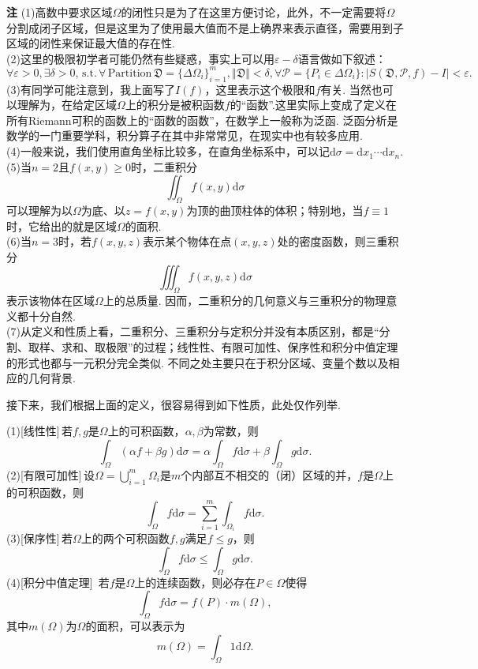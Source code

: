 \documentclass{ctexart}
\newenvironment{custom}[1]{\par\noindent \textbf{#1}\quad}{\par\vspace{1em}}
\begin{document}
\begin{custom}{注}
(1)高数中要求区域$\Omega$的闭性只是为了在这里方便讨论，此外，不一定需要将$\Omega$分割成闭子区域，但是这里为了使用最大值而不是上确界来表示直径，需要用到子区域的闭性来保证最大值的存在性.\\
(2)这里的极限初学者可能仍然有些疑惑，事实上可以用$\varepsilon-\delta$语言做如下叙述：
$$\forall \varepsilon>0,\exists \delta>0,\,\mathrm{s.t.}\,\forall\,\mathrm{Partition}\,\mathfrak{D}=\{\Delta\Omega_{i}\}_{i=1}^{m},\Vert\mathfrak{D}\Vert<\delta,\forall \mathcal{P}=\{P_{i}\in\Delta\Omega_{i}\}:|S(\mathfrak{D},\mathcal{P},f)-I|<\varepsilon.$$
(3)有同学可能注意到，我上面写了$I(f)$，这里表示这个极限和$f$有关. 当然也可以理解为，在给定区域$\Omega$上的积分是被积函数$f$的“函数”.这里实际上变成了定义在所有Riemann可积的函数上的“函数的函数”，在数学上一般称为泛函. 泛函分析是数学的一门重要学科，积分算子在其中非常常见，在现实中也有较多应用.\\
(4)一般来说，我们使用直角坐标比较多，在直角坐标系中，可以记$\mathrm{d}\sigma=\mathrm{d}x_{1}\cdots\mathrm{d}x_{n}$.
(5)当$n=2$且$f(x,y)\geqslant 0$时，二重积分
$$\iint_{\Omega}{f(x,y)\mathrm{d}\sigma}$$
可以理解为以$\Omega$为底、以$z=f(x,y)$为顶的曲顶柱体的体积；特别地，当$f\equiv 1$时，它给出的就是区域$\Omega$的面积.\\
(6)当$n=3$时，若$f(x,y,z)$表示某个物体在点$(x,y,z)$处的密度函数，则三重积分
$$\iiint_{\Omega}{f(x,y,z)\mathrm{d}\sigma}$$
表示该物体在区域$\Omega$上的总质量. 因而，二重积分的几何意义与三重积分的物理意义都十分自然.\\
(7)从定义和性质上看，二重积分、三重积分与定积分并没有本质区别，都是“分割、取样、求和、取极限”的过程；线性性、有限可加性、保序性和积分中值定理的形式也都与一元积分完全类似. 不同之处主要只在于积分区域、变量个数以及相应的几何背景.
\end{custom}

接下来，我们根据上面的定义，很容易得到如下性质，此处仅作列举.

\begin{proposition}
(1)[线性性]\,若$f,g$是$\Omega$上的可积函数，$\alpha,\beta$为常数，则
$$\int_{\Omega}{(\alpha f+\beta g)\mathrm{d}\sigma}=\alpha\int_{\Omega}{f\mathrm{d}\sigma}+\beta\int_{\Omega}{g\mathrm{d}\sigma}.$$
(2)[有限可加性]\,设$\Omega=\bigcup_{i=1}^{m}{\Omega_{i}}$是$m$个内部互不相交的（闭）区域的并，$f$是$\Omega$上的可积函数，则
$$\int_{\Omega}{f\mathrm{d}\sigma}=\sum_{i=1}^{m}{\int_{\Omega_{i}}{f\mathrm{d}\sigma}}.$$
(3)[保序性]\,若$\Omega$上的两个可积函数$f,g$满足$f\leqslant g$，则
$$\int_{\Omega}{f\mathrm{d}\sigma}\leqslant \int_{\Omega}{g\mathrm{d}\sigma}.$$
(4)[积分中值定理]\, 若$f$是$\Omega$上的连续函数，则必存在$P\in\Omega$使得
$$\int_{\Omega}{f\mathrm{d}\sigma}=f(P)\cdot m(\Omega),$$
其中$m(\Omega)$为$\Omega$的面积，可以表示为
$$m(\Omega)=\int_{\Omega}{1\mathrm{d}\Omega}.$$
\end{proposition}
\end{document}
